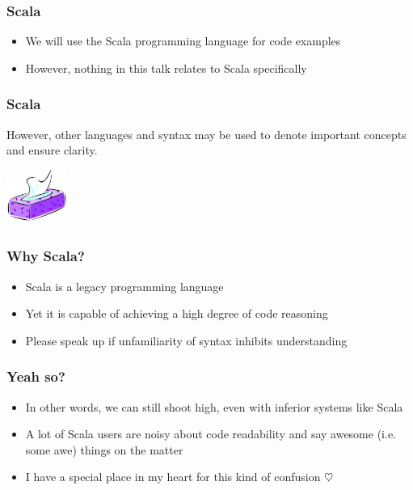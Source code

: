 \begin{frame}
\frametitle{Scala}
\begin{itemize}
  \item We will use the Scala programming language for code examples
  \item However, nothing in this talk relates to Scala specifically
\end{itemize}
\end{frame}

\begin{frame}
\frametitle{Scala}
\begin{center}
However, other languages and syntax may be used to denote important concepts and ensure clarity.
\end{center}
\begin{center}
\includegraphics[height=1.8cm]{image/tissues.jpg}
\end{center}
\end{frame}

\begin{frame}
\frametitle{Why Scala?}
\begin{itemize}
  \item Scala is a legacy programming language
  \item Yet it is capable of achieving a high degree of code reasoning
  \item Please speak up if unfamiliarity of syntax inhibits understanding
\end{itemize}
\end{frame}

\begin{frame}
\frametitle{Yeah so?}
\begin{itemize}
  \item In other words, we can still shoot high, even with inferior systems like Scala
  \item A lot of Scala users are noisy about code readability and say awesome (i.e. some awe) things on the matter
  \item<2-> I have a special place in my heart for this kind of confusion $\heartsuit$
\end{itemize}
\end{frame}
